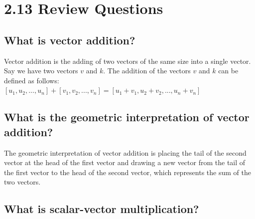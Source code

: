 \documentclass[
  letterpaper,
  DIV=11,
  numbers=noendperiod]{scrartcl}
\author{}
\date{}
\renewcommand*\contentsname{Table of contents}
\newcommand\contentsname{Table of contents}
\begin{document}

\newpage

\ifdefined\Shaded\renewenvironment{Shaded}{\begin{tcolorbox}[borderline west={3pt}{0pt}{shadecolor}, interior hidden, boxrule=0pt, enhanced, breakable, frame hidden, sharp corners]}{\end{tcolorbox}}\fi

\renewcommand*\contentsname{Table of contents}
{
\hypersetup{linkcolor=}
\setcounter{tocdepth}{4}
\tableofcontents
}
\newpage{}

\hypertarget{review-questions}{%
\section{\texorpdfstring{\textbf{2.13 Review
Questions}}{2.13 Review Questions}}\label{review-questions}}

\hypertarget{what-is-vector-addition}{%
\subsection{What is vector addition?}\label{what-is-vector-addition}}

Vector addition is the adding of two vectors of the same size into a
single vector. Say we have two vectors \(v\) and \(k\). The addition of
the vectors \(v\) and \(k\) can be defined as follows:\\
\([u_1, u_2, ..., u_n]+[v_1, v_2, ..., v_n] = [u_1+v_1, u_2+v_2, ..., u_n+v_n]\)

\hypertarget{what-is-the-geometric-interpretation-of-vector-addition}{%
\subsection{What is the geometric interpretation of vector
addition?}\label{what-is-the-geometric-interpretation-of-vector-addition}}

The geometric interpretation of vector addition is placing the tail of
the second vector at the head of the first vector and drawing a new
vector from the tail of the first vector to the head of the second
vector, which represents the sum of the two vectors.

\hypertarget{what-is-scalar-vector-multiplication}{%
\subsection{What is scalar-vector
multiplication?}\label{what-is-scalar-vector-multiplication}}
\end{document}
